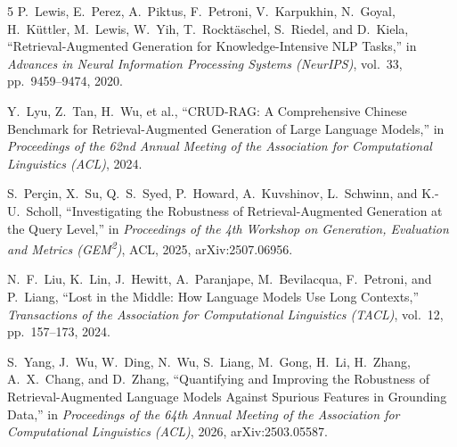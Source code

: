 \documentclass[conference]{IEEEtran}
\begin{document}
\begin{thebibliography}{5}
P.~Lewis, E.~Perez, A.~Piktus, F.~Petroni, V.~Karpukhin, N.~Goyal, H.~K\"{u}ttler, M.~Lewis, W.~Yih, T.~Rockt\"{a}schel, S.~Riedel, and D.~Kiela, ``Retrieval-Augmented Generation for Knowledge-Intensive NLP Tasks,'' in \textit{Advances in Neural Information Processing Systems (NeurIPS)}, vol.~33, pp.~9459--9474, 2020.

Y.~Lyu, Z.~Tan, H.~Wu, et al., ``CRUD-RAG: A Comprehensive Chinese Benchmark for Retrieval-Augmented Generation of Large Language Models,'' in \textit{Proceedings of the 62nd Annual Meeting of the Association for Computational Linguistics (ACL)}, 2024.

S.~Per\c{c}in, X.~Su, Q.~S.~Syed, P.~Howard, A.~Kuvshinov, L.~Schwinn, and K.-U.~Scholl, ``Investigating the Robustness of Retrieval-Augmented Generation at the Query Level,'' in \textit{Proceedings of the 4th Workshop on Generation, Evaluation and Metrics (GEM\textsuperscript{2})}, ACL, 2025, arXiv:2507.06956.

N.~F.~Liu, K.~Lin, J.~Hewitt, A.~Paranjape, M.~Bevilacqua, F.~Petroni, and P.~Liang, ``Lost in the Middle: How Language Models Use Long Contexts,'' \textit{Transactions of the Association for Computational Linguistics (TACL)}, vol.~12, pp.~157--173, 2024.

S.~Yang, J.~Wu, W.~Ding, N.~Wu, S.~Liang, M.~Gong, H.~Li, H.~Zhang, A.~X.~Chang, and D.~Zhang, ``Quantifying and Improving the Robustness of Retrieval-Augmented Language Models Against Spurious Features in Grounding Data,'' in \textit{Proceedings of the 64th Annual Meeting of the Association for Computational Linguistics (ACL)}, 2026, arXiv:2503.05587.
\end{thebibliography}
\end{document}
